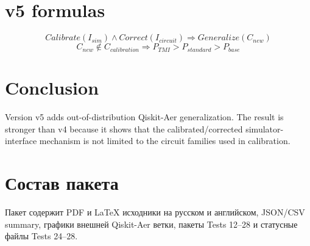 \documentclass[12pt,a4paper]{article}
\begin{document}
\section{v5 formulas}
\[
\boxed{Calibrate(I_{sim})\land Correct(I_{circuit})\Rightarrow Generalize(C_{new})}
\]
\[
\boxed{C_{new}\notin C_{calibration}\Rightarrow P_{TMI}>P_{standard}>P_{base}}
\]

\section{Conclusion}
Version v5 adds out-of-distribution Qiskit-Aer generalization. The result is stronger than v4 because it shows that the calibrated/corrected simulator-interface mechanism is not limited to the circuit families used in calibration.

\appendix\section{Состав пакета}
Пакет содержит PDF и LaTeX исходники на русском и английском, JSON/CSV summary, графики внешней Qiskit-Aer ветки, пакеты Tests 12--28 и статусные файлы Tests 24--28.
\end{document}
